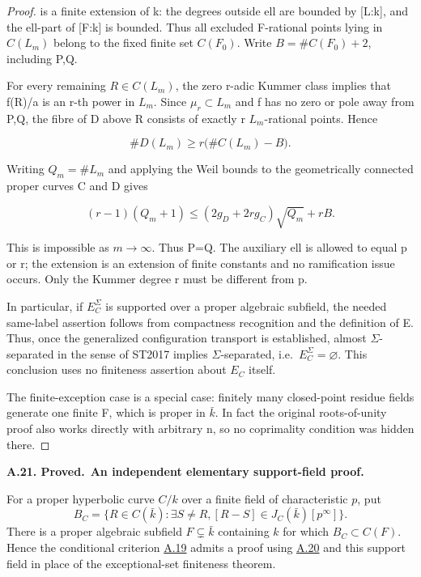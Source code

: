 \documentclass[11pt,a4paper]{article}
\newenvironment{claim}[3]{\par\medskip\noindent\hypertarget{#1}{\textbf{#1. #2.}}\ \textbf{#3.}\par\nopagebreak\smallskip\begingroup\itshape}{\endgroup\par\smallskip}
\newcommand{\statementref}[1]{\hyperlink{#1}{#1}}
\begin{document}
\begin{proof}
is a finite extension of k: the degrees outside ell are bounded by {[}L:k{]}, and the ell-part of {[}F:k{]} is bounded. Thus all excluded F-rational points lying in \(C(L_m)\) belong to the fixed finite set \(C(F_0)\). Write \(B=\#C(F_0)+2\), including P,Q.

For every remaining \(R{\in}C(L_m)\), the zero r-adic Kummer class implies that f(R)/a is an r-th power in \(L_m\). Since \({\mu}_r{\subset}L_m\) and f has no zero or pole away from P,Q, the fibre of D above R consists of exactly r \(L_m\)-rational points. Hence

\[\#D(L_m)\ge r\bigl(\#C(L_m)-B\bigr).\]

Writing \(Q_m=\#L_m\) and applying the Weil bounds to the geometrically connected proper curves C and D gives

\[(r-1)(Q_m+1)\le (2g_D+2r g_C)\sqrt{Q_m}+rB.\]

This is impossible as \(m{\to}{\infty}\). Thus P=Q. The auxiliary ell is allowed to equal p or r; the extension is an extension of finite constants and no ramification issue occurs. Only the Kummer degree r must be different from p.

In particular, if \(E_C^{\Sigma}\) is supported over a proper algebraic subfield, the needed same-label assertion follows from compactness recognition and the definition of E. Thus, once the generalized configuration transport is established, almost \({\Sigma}\)-separated in the sense of ST2017 implies \({\Sigma}\)-separated, i.e.~\(E_C^{\Sigma}=\varnothing\). This conclusion uses no finiteness assertion about \(E_C\) itself.

The finite-exception case is a special case: finitely many closed-point residue fields generate one finite F, which is proper in \(\bar k\). In fact the original roots-of-unity proof also works directly with arbitrary n, so no coprimality condition was hidden there.


\end{proof}

\begin{claim}{A.21}{Proved}{An independent elementary support-field proof}

For a proper hyperbolic curve $C/k$ over a finite field of
characteristic $p$, put
\[
B_C=\{R\in C(\bar k):\exists S\ne R,
       [R-S]\in J_C(\bar k)[p^\infty]\}.
\]
There is a proper algebraic subfield $F\subsetneq\bar k$ containing
$k$ for which $B_C\subset C(F)$. Hence the conditional criterion
\statementref{A.19} admits a proof using
\statementref{A.20} and this support field in place of the
exceptional-set finiteness theorem.

\end{claim}
\end{document}
